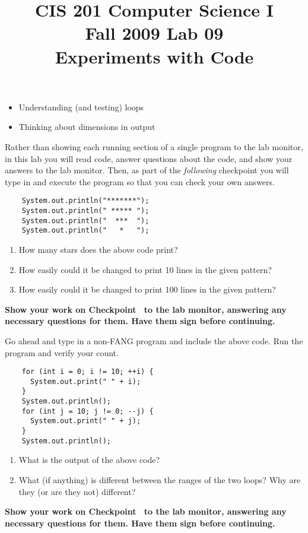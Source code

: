 \documentclass[12pt,oneside]{memoir}
\title{CIS 201 Computer Science I\\Fall 2009 Lab #1\\#2}%
\newenvironment{Checkpoint}[1]{%
  \begin{Exercise}[name={Checkpoint},title={#1}]}{%
  \end{Exercise}%
  \textbf{Show your work on Checkpoint~\theExercise{} to the lab monitor, %
    answering any necessary questions for them.  Have them sign before continuing.}}
\newcommand{\lab}[2]{%
  \title{CIS 201 Computer Science I\\Fall 2009 Lab #1\\#2}%
  \maketitle%
}
\begin{document}
\lab{09}{Experiments with Code}

\begin{itemize}
\item Understanding (and testing) loops
\item Thinking about dimensions in output
\end{itemize}

\begin{Checkpoint}{Getting Started}
  Rather than showing each running section of a single program to the
  lab monitor, in this lab you will read code, answer questions about
  the code, and show your answers to the lab monitor. Then, as part of
  the \emph{following} checkpoint you will type in and execute the
  program so that you can check your own answers.

  \begin{lstlisting}
    System.out.println("*******");
    System.out.println(" ***** ");
    System.out.println("  ***  ");
    System.out.println("   *   ");     
  \end{lstlisting}

  \begin{enumerate}
  \item How many stars does the above code print?
  \item How easily could it be changed to print 10 lines in the given
    pattern?
  \item How easily could it be changed to print 100 lines in the given
    pattern?
  \end{enumerate}
\end{Checkpoint}

\begin{Checkpoint}{Some Loops}
  Go ahead and type in a non-FANG program and include the above
  code. Run the program and verify your count.
  \begin{lstlisting}
    for (int i = 0; i != 10; ++i) {
      System.out.print(" " + i);
    }
    System.out.println();
    for (int j = 10; j != 0; --j) {
      System.out.print(" " + j);
    }
    System.out.println();    
  \end{lstlisting}

  \begin{enumerate}
  \item What is the output of the above code?
  \item What (if anything) is different between the ranges of the two
    loops? Why are they (or are they not) different?
  \end{enumerate}
\end{Checkpoint}
\end{document}
